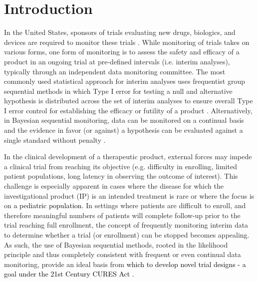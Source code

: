 \documentclass[12pt]{article}
\begin{document}
\section{Introduction}

In the United States, sponsors of trials evaluating new drugs, biologics, and devices are required to monitor these trials \citep{FDA2006}. 
%
While monitoring of trials takes on various forms, one form of monitoring is to assess the safety and efficacy of a product in an ongoing trial at pre-defined intervals (i.e. interim analyses), typically through an independent data monitoring committee. 
%
The most commonly used statistical approach for interim analyses uses frequentist group sequential methods in which Type I error for testing a null and alternative hypothesis is distributed across the set of interim analyses to ensure overall Type I error control for establishing the efficacy or futility of a product \citep{Jennison2000}.  
%
Alternatively, in Bayesian sequential monitoring, data can be monitored on a continual basis and the evidence in favor (or against) a hypothesis can be evaluated against a single standard without penalty \citep{Spiegelhalter1993}. %

In the clinical development of a therapeutic product, external forces may impede a clinical trial from reaching its objective (e.g. difficulty in enrolling, limited patient populations, long latency in observing the outcome of interest). 
%
This challenge is especially apparent in cases where the disease for which the investigational product (IP) is an intended treatment is rare or where the focus is on \textcolor{black}{a pediatric population}. 
%
In settings where patients are difficult to enroll, and therefore meaningful numbers of patients will complete follow-up prior to the trial reaching full enrollment, the concept of frequently monitoring interim data to determine whether a trial (or enrollment) can be stopped becomes appealing. 
%
As such, the use of Bayesian sequential methods, rooted in the likelihood principle and thus completely consistent with frequent or even continual data monitoring, provide an ideal basis from \textcolor{black}{which to develop novel trial designs - a goal under the 21st Century CURES Act \citep{USCongress2016}.}
%
\end{document}

